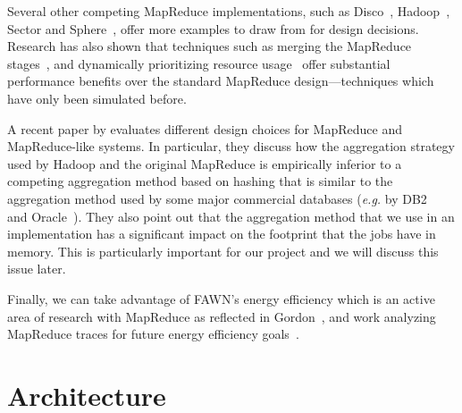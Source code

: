 \documentclass[10pt,letter,final,article,twocolumn]{article} %
\begin{document}
Several other competing MapReduce implementations, such as
Disco~\citep{disco10}, Hadoop~\citep{hadoop10}, Sector and
Sphere~\citep{sphere09}, offer more examples to draw from for design
decisions.  Research has also shown that techniques such as merging the
MapReduce stages~\citep{barrier10}, and dynamically prioritizing resource
usage~\citep{sandholm09} offer substantial performance benefits over the
standard MapReduce design---techniques which have only been simulated
before. 

A recent paper by \citet{yu2009distributed} evaluates different design choices for MapReduce and MapReduce-like systems. In particular, they discuss how the aggregation strategy used by Hadoop and the original MapReduce is empirically inferior to a competing aggregation method based on hashing that is similar to the aggregation method used by some major commercial databases (\emph{e.g.} by DB2~\citep{db210} and Oracle~\citep{oracle10}). They also point out that the aggregation method that we use in an implementation has a significant impact on the footprint that the jobs have in memory. This is particularly important for our project and we will discuss this issue later.

 Finally, we can take advantage of FAWN's energy efficiency which is
an active area of research with MapReduce as reflected in
Gordon~\citep{gordon09},  and work analyzing MapReduce traces for future
energy efficiency goals~\citep{chen10}.

\section{Architecture}
\end{document}

